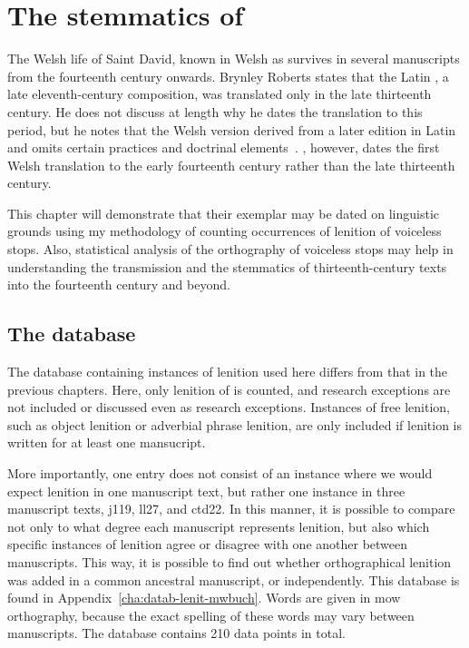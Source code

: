 \chapter{The stemmatics of }
\label{cha:stemm-mwbuch-dewi}
The Welsh life of Saint David, known in Welsh as  survives in several manuscripts from the fourteenth century onwards. Brynley Roberts states that the Latin , a late eleventh-century composition, was translated only in the late thirteenth century. He does not discuss at length why he dates the translation to this period, but he notes that the Welsh version derived from a later edition in Latin and omits certain practices and doctrinal elements~\autocite[218--219]{Rob_Ystoriaeu11}. \Textcite[liv]{Eva_Welsh88}, however, dates the first Welsh translation to the early fourteenth century rather than the late thirteenth century.

This chapter will demonstrate that their exemplar may be dated on linguistic grounds using my methodology of counting occurrences of lenition of voiceless stops. Also, statistical analysis of the orthography of voiceless stops may help in understanding the transmission and the stemmatics of thirteenth-century texts into the fourteenth century and beyond.

\section{The database}
\label{sec:database}

The database containing instances of lenition used here differs from that in the previous chapters. Here, only lenition of  is counted, and research exceptions are not included or discussed even as research exceptions. Instances of free lenition, such as object lenition or adverbial phrase lenition, are only included if lenition is written for at least one mansucript.

More importantly, one entry does not consist of an instance where we would expect lenition in one manuscript text, but rather one instance in three manuscript texts, \gls{j119}, \gls{ll27}, and \gls{ctd22}. In this manner, it is possible to compare not only to what degree each manuscript represents lenition, but also which specific instances of lenition agree or disagree with one another between manuscripts. This way, it is possible to find out whether orthographical lenition was added in a common ancestral manuscript, or independently. This database is found in Appendix~\ref{cha:datab-lenit-mwbuch}. Words are given in \gls{mow} orthography, because the exact spelling of these words may vary between manuscripts. The database contains 210 data points in total.

